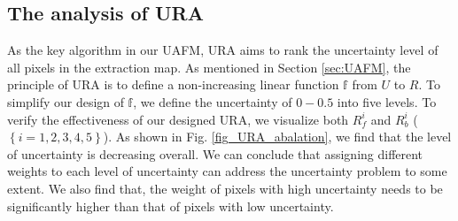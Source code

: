 \documentclass[lettersize,journal]{IEEEtran}
\begin{document}
\begin{figure*}
\centering
{}
\hfil
{}
\hfil
{}
\hfil
{}
\hfil
{}
\hfil
{}
\hfil
\caption{Visual examples of building extraction. The first row represents the visualizations of $G_{i}$, and the second row represents the uncertainty visualization of $M_{i}$.}
\label{fig_uafm_abalation}
\vspace{-0.5em}
\end{figure*}

\subsection{The analysis of URA}

\begin{figure*}
\centering
{}
\hfil
{}
\hfil
{}
\hfil
{}
\hfil
{}
\hfil
{}
\hfil
\caption{Visual examples of building extraction. The first row represents the visualizations of $R_{f}^{i}$, and the second row represents the uncertainty visualization of $R_{b}^{i}$.}
\label{fig_URA_abalation}
\vspace{-0.5em}
\end{figure*}

As the key algorithm in our UAFM, URA aims to rank the uncertainty level of all pixels in the extraction map. As mentioned in Section \ref{sec:UAFM}, the principle of URA is to define a non-increasing linear function $\mathbb{f}$ from $U$ to $R$. To simplify our design of $\mathbb{f}$, we define the uncertainty of $0-0.5$ into five levels. To verify the effectiveness of our designed URA, we visualize both $R_{f}^{i}$ and $R_{b}^{i}$ ($\left\{i=1,2,3,4,5 \right \}$). As shown in Fig. \ref{fig_URA_abalation}, we find that the level of uncertainty is decreasing overall. We can conclude that assigning different weights to each level of uncertainty can address the uncertainty problem to some extent. We also find that, the weight of pixels with high uncertainty needs to be significantly higher than that of pixels with low uncertainty. 
\end{document}
